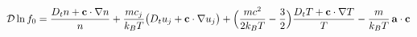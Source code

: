 \documentclass[preview]{standalone}
\begin{document}
\begin{align*}
\special{dvisvgm:raw <g id='unique000'>}\mathcal D\ln f_0= \special{dvisvgm:raw </g>}\special{dvisvgm:raw <g id='unique001'>}\frac{D_tn+\va c\cdot\nabla n}{n} \special{dvisvgm:raw </g>}\special{dvisvgm:raw <g id='unique002'>}+\frac{mc_j}{k_BT}\big(D_tu_j+\va c\cdot\nabla u_j\big) \special{dvisvgm:raw </g>}\special{dvisvgm:raw <g id='unique003'>}+\Big(\frac{mc^2}{2k_BT}-\frac32\Big)\frac{D_tT+\va c\cdot\nabla T}{T} \special{dvisvgm:raw </g>}\special{dvisvgm:raw <g id='unique004'>}-\frac{m}{k_BT}\,\va a\cdot\va c\special{dvisvgm:raw </g>}
\end{align*}
\end{document}
